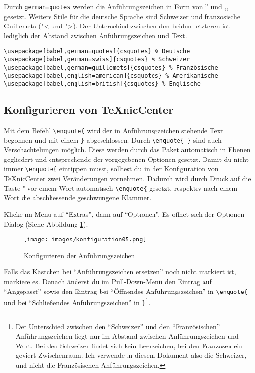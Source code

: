 Durch \verb|german=quotes| werden die Anführungszeichen in Form von '' und ,, gesetzt. Weitere Stile für die deutsche Sprache sind Schweizer und franzosische Guillemets ("< und ">). Der Unterschied zwischen den beiden letzteren ist lediglich der Abstand zwischen Anführungszeichen und Text.
\begin{lstlisting}[caption={Häufig verwendete \enquote{csquotes} Optionen.},label=lst:csquotesoptions,frame=tb]
\usepackage[babel,german=quotes]{csquotes} % Deutsche
\usepackage[babel,german=swiss]{csquotes} % Schweizer
\usepackage[babel,german=guillemets]{csquotes} % Französische
\usepackage[babel,english=american]{csquotes} % Amerikanische
\usepackage[babel,english=british]{csquotes} % Englische
\end{lstlisting}

\subsection{Konfigurieren von TeXnicCenter}

Mit dem Befehl \verb|\enquote{| wird der in Anführunsgzeichen stehende Text begonnen und mit einem \verb|}| abgeschlossen. Durch \verb|\enquote{ }| sind auch Verschachtelungen möglich. Diese werden durch das Paket automatisch in Ebenen gegliedert und entsprechende der vorgegebenen Optionen gesetzt. Damit du nicht immer \verb|\enquote{| eintippen musst, solltest du in der Konfiguration von TeXnicCenter zwei Veränderungen vornehmen. Dadurch wird durch Druck auf die Taste "{} vor einem Wort automatisch \verb|\enquote{| gesetzt, respektiv nach einem Wort die abschliessende geschwungene Klammer.

Klicke im Menü auf \enquote{Extras}, dann auf \enquote{Optionen}. Es öffnet sich der Optionen-Dialog (Siehe Abbildung \ref{fig:konfiguration05}).

\begin{figure}
	\begin{center}
		\texttt{[image: images/konfiguration05.png]}
		\caption{Konfigurieren der Anführungszeichen}
		\label{fig:konfiguration05}
	\end{center}
\end{figure}

Falls das Kästchen bei \enquote{Anführungszeichen ersetzen} noch nicht markiert ist, markiere es. Danach änderst du im Pull-Down-Menü den Eintrag auf \enquote{Angepasst} sowie den Eintrag bei \enquote{Öffnendes Anführungszeichen} in \texttt{\textbackslash enquote\{} und bei \enquote{Schließendes Anführungszeichen} in \texttt{\}}\footnote{Der Unterschied zwischen den \enquote{Schweizer} und den \foreignquote{french}{Französischen} Anführungszeichen liegt nur im Abstand zwischen Anführungszeichen und Wort. Bei den Schweizer findet sich kein Leerzeichen, bei den Franzosen ein geviert Zwischenraum. Ich verwende in diesem Dokument also die Schweizer, und nicht die Französischen Anführungszeichen.}.

